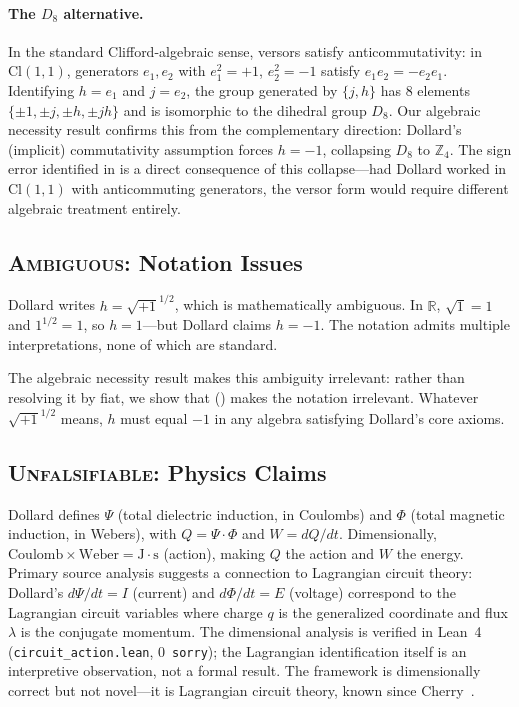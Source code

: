\documentclass[runningheads]{llncs}
\begin{document}
\paragraph{The $D_8$ alternative.}
In the standard Clifford-algebraic sense, versors
satisfy anticommutativity: in $\mathrm{Cl}(1,1)$,
generators $e_1, e_2$ with $e_1^2 = +1$, $e_2^2 = -1$ satisfy
$e_1 e_2 = -e_2 e_1$. Identifying $h = e_1$ and $j = e_2$, the group
generated by $\{j, h\}$ has 8 elements $\{\pm 1, \pm j, \pm h, \pm jh\}$
and is isomorphic to the dihedral group $D_8$.
Our algebraic necessity result confirms this from the complementary direction:
Dollard's (implicit) commutativity assumption forces $h = -1$, collapsing
$D_8$ to $\mathbb{Z}_4$. The sign error identified in 
is a direct consequence of this collapse---had Dollard worked in
$\mathrm{Cl}(1,1)$ with anticommuting generators, the versor form would
require different algebraic treatment entirely.

\subsection{\textsc{Ambiguous}: Notation Issues}

Dollard writes $h = \sqrt{+1}^{1/2}$, which is mathematically ambiguous.
In $\mathbb{R}$, $\sqrt{1} = 1$ and $1^{1/2} = 1$, so $h = 1$---but Dollard
claims $h = -1$. The notation admits multiple interpretations, none of which
are standard.

The algebraic necessity result makes this ambiguity irrelevant:
rather than resolving it by fiat, we show that
() makes the notation irrelevant. Whatever
$\sqrt{+1}^{1/2}$ means, $h$ must equal $-1$ in any algebra satisfying
Dollard's core axioms.

\subsection{\textsc{Unfalsifiable}: Physics Claims}

Dollard defines $\Psi$ (total dielectric induction, in Coulombs) and $\Phi$
(total magnetic induction, in Webers), with $Q = \Psi \cdot \Phi$ and
$W = dQ/dt$. Dimensionally, $\text{Coulomb} \times \text{Weber} =
\text{J} \cdot \text{s}$ (action), making $Q$ the action and $W$ the energy.
Primary source analysis suggests a connection to Lagrangian circuit
theory: Dollard's $d\Psi/dt = I$ (current) and $d\Phi/dt = E$ (voltage)
correspond to the Lagrangian circuit variables where charge $q$ is the
generalized coordinate and flux $\lambda$ is the conjugate momentum.
The dimensional analysis is verified in Lean~4 (\texttt{circuit\_action.lean},
0~\texttt{sorry}); the Lagrangian identification itself is an interpretive
observation, not a formal result.
The framework is dimensionally correct but not novel---it is Lagrangian circuit
theory, known since Cherry~\cite{cherry1951}.
\end{document}
